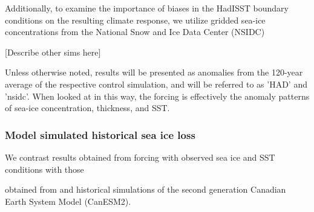 \documentclass[twocol]{ametsoc}
\begin{document}
Additionally, to examine the importance of biases in the HadISST boundary conditions on the resulting climate response, we utilize gridded sea-ice concentrations from the National Snow and Ice Data Center (NSIDC)

[Describe other sims here]

Unless otherwise noted, results will be presented as anomalies from the 120-year average of the respective control simulation, and will be referred to as 'HAD' and 'nsidc'. When looked at in this way, the forcing is effectively the anomaly patterns of sea-ice concentration, thickness, and SST. 
 
\subsubsection{Model simulated historical sea ice loss}

 We contrast results obtained from forcing with observed sea ice and SST conditions with those 

 obtained from  and historical simulations of the second generation Canadian Earth System Model (CanESM2).

\end{document}

